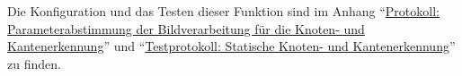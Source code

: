 Die Konfiguration und das Testen dieser Funktion sind im Anhang ``\hyperlink{opencv.1}{Protokoll: Parameterabstimmung der Bildverarbeitung für die Knoten- und Kantenerkennung}''  und ``\hyperlink{outgoing-lines-test.1}{Testprotokoll: Statische Knoten- und Kantenerkennung}'' zu finden.